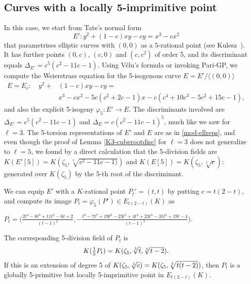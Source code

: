 \documentclass{amsart}
\theoremstyle{plain}
\theoremstyle{definition}
\begin{document}
\subsection{Curves with a locally 5-imprimitive point}
In this case, we start from Tate's normal form
\begin{equation}
\label{Tate-5}
E': y^2+(1-c)xy-cy=x^3-cx^2
\end{equation}
that parametrises elliptic curves with $(0,0)$ as a $5$-rational point
(see Kulesz~\cite{Kulesz}). 
It has further points $(0,c)$, $(c,0)$ and $(c, c^2)$ of order 5,
and its discriminant equals
$\Delta_{E'}=c^5 \left(c^2-11 c-1\right)$.
%
Using V\'elu's formula \cite{Velu} or invoking Pari-GP,
we compute the Weierstrass equation for the 5-isogenous curve 
$E=E'/\langle(0,0)\rangle$
\begin{align*}
E=E_c: \quad y^2+&(1-c)xy-cy= \\
&x^3-cx^2 -5 c (c^2+2 c-1)x-
c (c^4+ 10 c^3 - 5 c^2+ 15 c -1),
\end{align*}
and also the explicit 5-isogeny $\varphi_5: E'\rightarrow E$. 
The discriminants involved are
$\Delta_{E'}=c^5(c^2-11c-1)$ and $\Delta_{E}=c(c^2-11c-1)^5$, 
much like we saw for $\ell=3$.
The 5-torsion representations
of $E'$ and $E$ are as in \eqref{mod-ellreps}, 
and even though the proof of Lemma \ref{K3-cuberootdisc}
for $\ell=3$  does not generalize to $\ell=5$, we found by 
a direct calculation that the 5-division fields are 
$K(E'[5])=K(\zeta_5,\sqrt[5]{c^2-11c-1)})$ and
$K(E[5])=K(\zeta_5,\sqrt[5]{c})$: 
generated over $K(\zeta_5)$ by the 5-th root of the discriminant.

We can equip $E'$ with a $K$-rational point $P_t'=(t,t)$ by 
putting $c=t(2-t)$, and compute its image 
$P_t=\varphi_5(P')\in E_{t(2-t)}(K)$ as

\medskip
\centerline{$
P_t= \big(\frac{2 t^4-8 t^3+11 t^2-6 t+2}{(t-1)^2} ,
-\frac{t^8-7 t^7+19 t^6-23 t^5+4 t^4+23 t^3-31 t^2+19 t-4}{(t-1)^3}\big).
$}
\medskip
\noindent
The corresponding 5-division field of $P_t$ is
$$
\textstyle
K(\frac15 P_t)=K(\zeta_5, \root 5 \of t, \root 5 \of {t-2}).
$$
If this is an extension of degree 5 of 
$K(\zeta_5, \root 5 \of c)=K(\zeta_5, \root 5 \of {t(t-2)})$, then 
$P_t$ is a globally 5-primitive but locally 5-imprimitive point 
in $E_{t(2-t)}(K)$.
\end{document}
